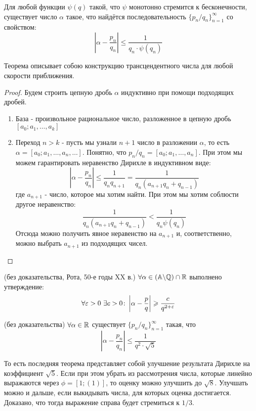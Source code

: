 \begin{theorem}
	Для любой функции $\psi(q)$ такой, что $\psi$ монотонно стремится к бесконечности, существует число $\alpha$ такое, что найдётся последовательность $\{p_n/q_n\}_{n = 1}^\infty$ со свойством:
	\[
		\left|\alpha -  \frac{p_n}{q_n}\right| \le \frac{1}{q_n \cdot \psi(q_n)}
	\]
\end{theorem}

\begin{note}
	Теорема описывает собою конструкцию трансцендентного числа для любой скорости приближения.
\end{note}

\begin{proof}
	Будем строить цепную дробь $\alpha$ индуктивно при помощи подходящих дробей.
	\begin{enumerate}
		\item База - произвольное рациональное число, разложенное в цепную дробь $[a_0; a_1, \ldots, a_k]$
		\item Переход $n > k$ - пусть мы узнали $n + 1$ число в разложении $\alpha$, то есть $\alpha = [a_0; a_1, \ldots, a_n, \ldots]$. Понятно, что $p_n/q_n = [a_0; a_1, \ldots, a_n]$. При этом мы можем гарантировать неравенство Дирихле в индуктивном виде:
		\[
			\left|\alpha - \frac{p_n}{q_n}\right| \le \frac{1}{q_n q_{n + 1}} = \frac{1}{q_n (a_{n + 1}q_n + q_{n - 1})}
		\]
		где $a_{n + 1}$ - число, которое мы хотим найти. При этом мы хотим соблюсти другое неравенство:
		\[
			\frac{1}{q_n (a_{n + 1} q_n + q_{n - 1})} < \frac{1}{q_n \psi(q_n)}
		\]
		Отсюда можно получить явное неравенство на $a_{n + 1}$ и, соответственно, можно выбрать $a_{n + 1}$ из подходящих чисел.
	\end{enumerate}
\end{proof}

\begin{theorem} (без доказательства, Рота, 50-е годы XX в.)
	$\forall \alpha \in (\mathbb{A} \backslash \mathbb{Q}) \cap \mathbb{R}$ выполнено утверждение:
	\[
		\forall \eps > 0\ \exists c > 0 \colon \left|\alpha - \frac{p}{q}\right| \ge \frac{c}{q^{2 + \eps}}
	\]
\end{theorem}

\begin{theorem} (без доказательства)
	$\forall \alpha \in \mathbb{R}$ существует $\{p_n/q_n\}_{n = 1}^\infty$ такая, что
	\[
		\left|\alpha - \frac{p_n}{q_n}\right| \le \frac{1}{q^2 \cdot \sqrt{5}}
	\]
\end{theorem}

\begin{note}
	То есть последняя теорема представляет собой улучшение результата Дирихле на коэффициент $\sqrt{5}$. Если при этом убрать из рассмотрения числа, которые линейно выражаются через $\phi = [1; (1)]$, то оценку можно улучшить до $\sqrt{8}$. Улучшать можно и дальше, если выкидывать числа, для которых оценка достигается. Доказано, что тогда выражение справа будет стремиться к $1/3$.
\end{note}